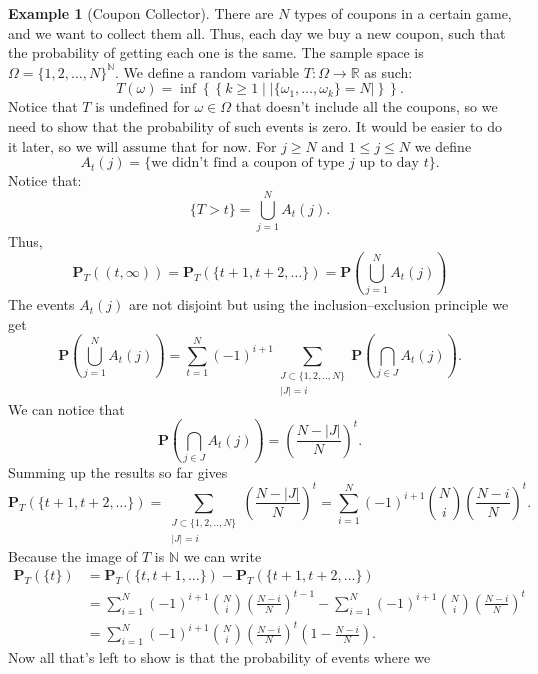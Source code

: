 \documentclass[11pt,a4paper]{article}
\theoremstyle{definition}
\newtheorem{example}{Example}[section]
\theoremstyle{plain}
\newcommand{\N}{\mathbb{N}}
\newcommand{\R}{\mathbb{R}}
\newcommand{\Prob}{\mathbf{P}}
\newcommand{\set}[2]{ \left\{ #1 \mid #2 \right\} }
\newcommand{\abs}[1]{\left\lvert #1\right\rvert}
\begin{document}
  \begin{example}[Coupon Collector]
    There are $N$ types of coupons in a certain game, and we want to collect
    them all. 
    Thus, each day we buy a new coupon, such that the probability of getting
    each one is the same.
    The sample space is $\Omega = \{1,2,\dots,N\}^{\N}$.
    We define a random variable $T \colon \Omega \to \R$ as such:
    \[
      T(\omega) = 
      \inf\left\{\set{k \geq 1}{\abs{\{\omega_1,\dots,\omega_k\} = N}}\right\}.
    \]
    Notice that $T$ is undefined for $\omega \in \Omega$ that doesn't include
    all the coupons, so we need to show that the probability of such events
    is zero. It would be easier to do it later, so we will assume that for
    now. For $j \geq N$ and $1 \le j \le N$ we define
    \[
      A_t(j) = \{\text{we didn't find a coupon of type $j$ up to day $t$}\}.
    \]
    Notice that:
    \[
      \{T > t\} = \bigcup_{j=1}^{N} A_t(j).
    \]
    Thus,
    \[
      \Prob_T\left((t,\infty)\right) =
      \Prob_T\left(\{t + 1, t + 2, \dots\}\right) =
      \Prob\left(\bigcup_{j=1}^{N} A_t(j) \right)
    \]
    The events $A_t(j)$ are not disjoint but using the inclusion--exclusion
    principle we get
    \[
      \Prob\left(\bigcup_{j=1}^{N} A_t(j) \right) =
      \sum_{t=1}^{N}(-1)^{i+1} 
      \sum_{\substack{J\subset\{1,2,..,N\} \\ \abs{J} = i}}
      \Prob\left(\bigcap_{j\in J}A_{t}(j)\right).
    \]
    We can notice that
    \[
      \Prob\left(\bigcap_{j\in J}A_{t}(j)\right) = 
      \left(\frac{N - \abs{J}}{N}\right)^t.
    \]
    Summing up the results so far gives
    \[
      \Prob_T\left(\{t + 1, t + 2, \dots\}\right) =
      \sum_{\substack{J\subset\{1,2,..,N\} \\ \abs{J} = i}}
      \left(\frac{N - \abs{J}}{N}\right)^t =
      \sum_{i=1}^{N} (-1)^{i+1} \binom{N}{i} \left(\frac{N-i}{N}\right)^{t}.
    \]
    Because the image of $T$ is $\N$ we can write
    \begin{align*}
      \Prob_T\left(\{t\}\right) &=
      \Prob_T\left(\{t, t + 1, \dots\}\right) -
      \Prob_T\left(\{t + 1, t + 2, \dots\}\right) \\ &=
      \sum_{i=1}^{N}(-1)^{i+1}\binom{N}{i}\left(\frac{N-i}{N}\right)^{t-1} -
      \sum_{i=1}^{N}(-1)^{i+1}\binom{N}{i}\left(\frac{N-i}{N}\right)^{t} \\ &=
      \sum_{i=1}^{N}(-1)^{i+1}\binom{N}{i}\left(\frac{N-i}{N}\right)^{t}
      \left(1 - \frac{N-i}{N}\right).
    \end{align*}
    Now all that's left to show is that the probability of events where we

\end{example}
\end{document}
